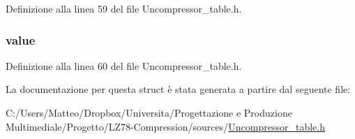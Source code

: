 Definizione alla linea 59 del file Uncompressor\-\_\-table.\-h.

\hypertarget{struct__uncompressor__table__row__t_ab069f2f375ef177b2e783fed615c001e}{
\subsubsection[{value}]{ value}}\label{struct__uncompressor__table__row__t_ab069f2f375ef177b2e783fed615c001e}


Definizione alla linea 60 del file Uncompressor\-\_\-table.\-h.



La documentazione per questa struct è stata generata a partire dal seguente file\-:\begin{DoxyCompactItemize}
\item 
C\-:/\-Users/\-Matteo/\-Dropbox/\-Universita/\-Progettazione e Produzione Multimediale/\-Progetto/\-L\-Z78-\/\-Compression/sources/\hyperlink{_uncompressor__table_8h}{Uncompressor\-\_\-table.\-h}\end{DoxyCompactItemize}
